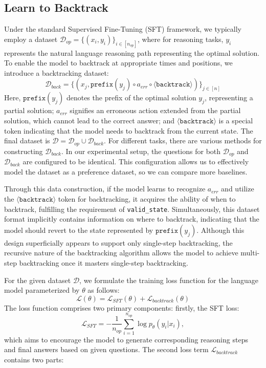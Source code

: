 \documentclass{article}
\theoremstyle{plain}
\theoremstyle{definition}
\theoremstyle{remark}
\begin{document}
\subsection{Learn to Backtrack}
\label{train}
Under the standard Supervised Fine-Tuning (SFT) framework, we typically employ a dataset $\mathcal{D}_{op} = \{(x_i, y_i)\}_{i \in [n_{op}]}$, where for reasoning tasks, $y_i$ represents the natural language reasoning path representing the optimal solution. To enable the model to backtrack at appropriate times and positions, we introduce a backtracking  dataset: 
$$\mathcal{D}_{back} = \{\left(x_j, \texttt{prefix}(y_j) \circ a_{err} \circ \langle \texttt{backtrack} \rangle\right)\}_{j \in [n]}$$
Here, $\texttt{prefix}(y_j)$ denotes the prefix of the optimal solution $y_j$, representing a partial solution; $a_{err}$ signifies an erroneous action extended from the partial solution, which cannot lead to the correct answer; and $\langle \texttt{backtrack} \rangle$ is a special token indicating that the model needs to backtrack from the current state. The final dataset is $\mathcal {D}=\mathcal D_{op}\cup \mathcal D_{back}$.
For different tasks, there are various methods for constructing $\mathcal{D}_{back}$.
In our experimental setup, the questions for both $\mathcal{D}_{op}$ and $\mathcal{D}_{back}$ are configured to be identical. This configuration allows us to effectively model the dataset as a preference dataset, so we can compare more baselines.

Through this data construction, if the model learns to recognize $a_{err}$ and utilize the $\langle \texttt{backtrack} \rangle$ token for backtracking, it acquires the ability of when to backtrack, fulfilling the requirement of \texttt{valid\_state}. Simultaneously, this dataset format implicitly contains information on where to backtrack, indicating that the model should revert to the state represented by $\texttt{prefix}(y_j)$. Although this design superficially appears to support only single-step backtracking, the recursive nature of the backtracking algorithm allows the model to achieve multi-step backtracking once it masters single-step backtracking. 


For the given dataset $\mathcal{D}$, we formulate the training loss function for the language model parameterized by $\theta$ as follows:
\begin{equation}
\mathcal{L}(\theta) = \mathcal{L}_{SFT}(\theta)+\mathcal{L}_{backtrack}(\theta)
\end{equation}
The loss function comprises two primary components: firstly, the SFT loss: $$\mathcal{L}_{SFT}=-\frac{1}{n_{op}}\sum_{i=1}^{n_{op}}\log p_{\theta}(y_i|x_i),$$
which aims to encourage the model to generate corresponding reasoning steps and final answers based on given questions. The second loss term $\mathcal{L}_{backtrack}$ contains two parts:
\end{document}
